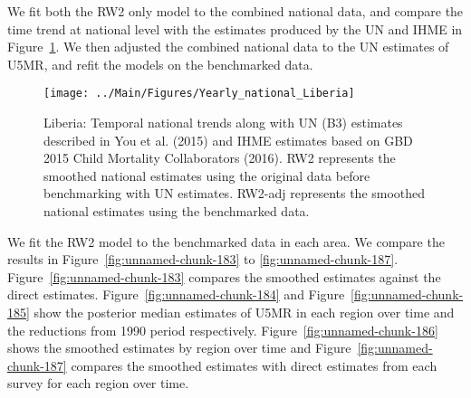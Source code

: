 \documentclass[12pt]{article}\usepackage[]{graphicx}\usepackage[]{color}
\newenvironment{knitrout}{}{} %
\begin{document}
We fit both the RW2 only model to the combined national data, and compare the time trend at national level with the estimates produced by the UN and IHME in Figure~\ref{fig:unnamed-chunk-182}. We then adjusted the combined national data to the UN estimates of U5MR, and refit the models on the benchmarked data. 

\begin{knitrout}
\color{fgcolor}\begin{figure}[bht]

{\centering \texttt{[image: ../Main/Figures/Yearly\_national\_Liberia]} 

}

\caption[Liberia]{Liberia: Temporal national trends along with UN (B3) estimates described in You et al. (2015) and IHME estimates based on GBD 2015 Child Mortality Collaborators (2016). RW2 represents the smoothed national estimates using the original data before benchmarking with UN estimates. RW2-adj represents the smoothed national estimates using the benchmarked data.}\label{fig:unnamed-chunk-182}
\end{figure}


\end{knitrout}
 

We fit the RW2 model to the benchmarked data in each area. 
We compare the results in Figure~\ref{fig:unnamed-chunk-183} to \ref{fig:unnamed-chunk-187}.
Figure~\ref{fig:unnamed-chunk-183} compares the smoothed estimates against the direct estimates. Figure~\ref{fig:unnamed-chunk-184} and Figure~\ref{fig:unnamed-chunk-185} show the posterior median estimates of U5MR in each region over time and the reductions from 1990 period respectively.
Figure~\ref{fig:unnamed-chunk-186} shows the smoothed estimates by region over time and Figure~\ref{fig:unnamed-chunk-187} compares the smoothed estimates with direct estimates from each survey for each region over time.




\end{document}
